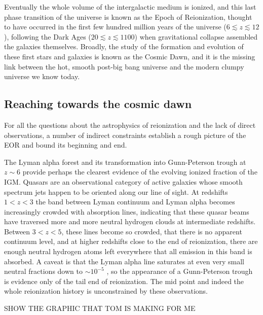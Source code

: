Eventually the whole volume of the intergalactic medium is ionized, and this last phase transition of the universe is known as the Epoch of Reionization, thought to have occurred in the first few hundred million years of the universe ($6\lesssim z\lesssim12$), following the Dark Ages ($20\lesssim z\lesssim 1100$) when gravitational collapse assembled the galaxies themselves. Broadly, the study of the formation and evolution of these first stars and galaxies is known as the Cosmic Dawn, and it is the missing link between the hot, smooth post-big bang universe and the modern clumpy universe we know today.


\subsection{Reaching towards the cosmic dawn}

For all the questions about the astrophysics of reionization and the lack of direct observations, a number of indirect constraints establish a rough picture of the EOR and bound its beginning and end. 

The Lyman alpha forest and its transformation into Gunn-Peterson trough at $z\sim6$ provide perhaps the clearest evidence of the evolving ionized fraction of the IGM. Quasars are an observational category of active galaxies whose smooth spectrum jets happen to be oriented along our line of sight. At redshifts $1<z<3$ the band between Lyman continuum and Lyman alpha becomes increasingly crowded with absorption lines, indicating that these quasar beams have traversed more and more neutral hydrogen clouds at intermediate redshifts. Between $3<z<5$, these lines become so crowded, that there is no apparent continuum level, and at higher redshifts close to the end of reionization, there are enough neutral hydrogen atoms left everywhere that all emission in this band is absorbed. A caveat is that the Lyman alpha line saturates at even very small neutral fractions down to $\sim10^{-5}$ \citep{FurlanettoReview}, so the appearance of a Gunn-Peterson trough is evidence only of the tail end of reionization. The mid point and indeed the whole reionization history is unconstrained by these observations.

SHOW THE GRAPHIC THAT TOM IS MAKING FOR ME

